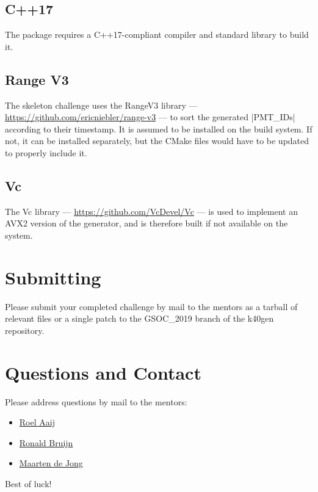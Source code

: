 \documentclass{article}
\begin{document}
\subsection{C++17}
The package requires a C++17-compliant compiler and standard library
to build it.

\subsection{Range V3}
The skeleton challenge uses the RangeV3 library —
\href{https://github.com/ericniebler/range-v3}{https://github.com/ericniebler/range-v3}
— to sort the generated |PMT_IDs| according to their timestamp. It is
assumed to be installed on the build system. If not, it can be
installed separately, but the CMake files would have to be updated to
properly include it.

\subsection{Vc}
The Vc library —
\href{https://github.com/VcDevel/Vc}{https://github.com/VcDevel/Vc} —
is used to implement an AVX2 version of the generator, and is
therefore built if not available on the system.

\section{Submitting}

Please submit your completed challenge by mail to the mentors as a
tarball of relevant files or a single patch to the GSOC\_2019 branch of
the k40gen repository.

\section{Questions and Contact}

Please address questions by mail to the mentors:
\begin{itemize}
\item \href{mailto:roel.aaij@nikhef.nl}{Roel Aaij}
\item \href{mailto:rbruijn@nikhef.nl}{Ronald Bruijn}
\item \href{mailto:m.de.jong@nikhef.nl}{Maarten de Jong}
\end{itemize}

\noindent Best of luck!
\end{document}
